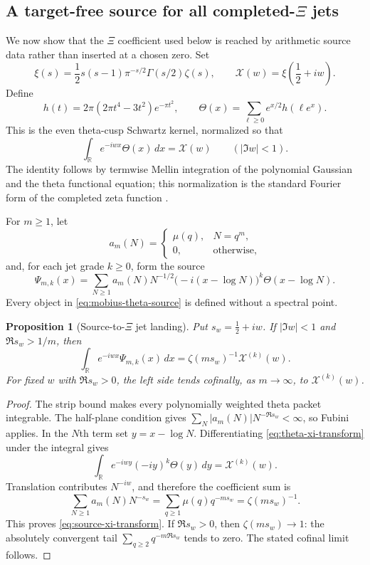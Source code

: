 \documentclass[11pt,a4paper]{amsart}
\theoremstyle{plain}
\newtheorem{proposition}[theorem]{Proposition}
\theoremstyle{definition}
\newcommand{\RR}{\mathbb R}
\begin{document}
\subsection{A target-free source for all completed-\texorpdfstring{$\Xi$}{Xi} jets}

We now show that the $\Xi$ coefficient used below is reached by arithmetic source data rather than
inserted at a chosen zero.  Set
\[
 \xi(s)=\frac12s(s-1)\pi^{-s/2}\Gamma(s/2)\zeta(s),\qquad
 \mathcal X(w)=\xi\left(\frac12+iw\right).
\]
Define
\[
 h(t)=2\pi(2\pi t^4-3t^2)e^{-\pi t^2},\qquad
 \Theta(x)=\sum_{\ell\geq0}e^{x/2}h(\ell e^x).
\]
This is the even theta-cusp Schwartz kernel, normalized so that
\begin{equation}\label{eq:theta-xi-transform}
             \int_{\RR}e^{-iwx}\Theta(x)\,dx=\mathcal X(w)
             \qquad(|\Im w|<1).
\end{equation}
The identity follows by termwise Mellin integration of the polynomial Gaussian and the theta
functional equation; this normalization is the standard Fourier form of the completed zeta
function \cite{Titchmarsh1986}.

For $m\geq1$, let
\[
 a_m(N)=
 \begin{cases}
   \mu(q),&N=q^m,\\
   0,&\text{otherwise},
 \end{cases}
\]
and, for each jet grade $k\geq0$, form the source
\begin{equation}\label{eq:mobius-theta-source}
 \Psi_{m,k}(x)=\sum_{N\geq1}
    a_m(N)N^{-1/2}\bigl(-i(x-\log N)\bigr)^k\Theta(x-\log N).
\end{equation}
Every object in \eqref{eq:mobius-theta-source} is defined without a spectral point.

\begin{proposition}[Source-to-$\Xi$ jet landing]\label{prop:source-xi-jet}
Put $s_w=\frac12+iw$.  If $|\Im w|<1$ and $\Re s_w>1/m$, then
\begin{equation}\label{eq:source-xi-transform}
 \int_{\RR}e^{-iwx}\Psi_{m,k}(x)\,dx
      =\zeta(ms_w)^{-1}\mathcal X^{(k)}(w).
\end{equation}
For fixed $w$ with $\Re s_w>0$, the left side tends cofinally, as $m\to\infty$, to
$\mathcal X^{(k)}(w)$.
\end{proposition}

\begin{proof}
The strip bound makes every polynomially weighted theta packet integrable.  The half-plane
condition gives
$\sum_N|a_m(N)|N^{-\Re s_w}<\infty$, so Fubini applies.  In the $N$th term set
$y=x-\log N$.  Differentiating \eqref{eq:theta-xi-transform} under the integral gives
\[
 \int_{\RR}e^{-iwy}(-iy)^k\Theta(y)\,dy=\mathcal X^{(k)}(w).
\]
Translation contributes $N^{-iw}$, and therefore the coefficient sum is
\[
 \sum_{N\geq1}a_m(N)N^{-s_w}
   =\sum_{q\geq1}\mu(q)q^{-ms_w}
   =\zeta(ms_w)^{-1}.
\]
This proves \eqref{eq:source-xi-transform}.  If $\Re s_w>0$, then
$\zeta(ms_w)\to1$: the absolutely convergent tail
$\sum_{q\geq2}q^{-m\Re s_w}$ tends to zero.  The stated cofinal limit follows.
\end{proof}
\end{document}
